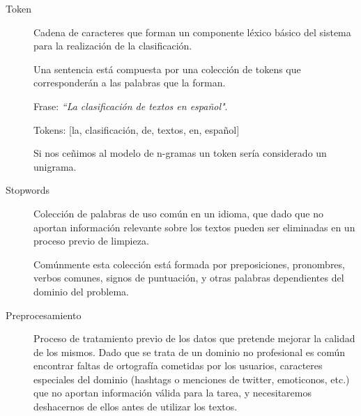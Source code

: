 \begin{description}
  \item[Token]
  
  Cadena de caracteres que forman un componente léxico básico del sistema para la realización de la clasificación.
  
  Una sentencia está compuesta por una colección de tokens que corresponderán a las palabras que la forman.
  
  Frase: \textit{``La clasificación de textos en español"}.
  
  Tokens: [la, clasificación, de, textos, en, español]
  
  Si nos ceñimos al modelo de n-gramas un token sería considerado un unigrama.
  
  \item[Stopwords]
  
  Colección de palabras de uso común en un idioma, que dado que no aportan información relevante sobre los textos pueden ser eliminadas en un proceso previo de limpieza.
  
  Comúnmente esta colección está formada por preposiciones, pronombres, verbos comunes, signos de puntuación, y otras palabras dependientes del dominio del problema.
  
  \item[Preprocesamiento]
  
  Proceso de tratamiento previo de los datos que pretende mejorar la calidad de los mismos. Dado que se trata de un dominio no profesional es común encontrar faltas de ortografía cometidas por los usuarios, caracteres especiales del dominio (hashtags o menciones de twitter, emoticonos, etc.) que no aportan información válida para la tarea, y necesitaremos deshacernos de ellos antes de utilizar los textos.
\end{description}
